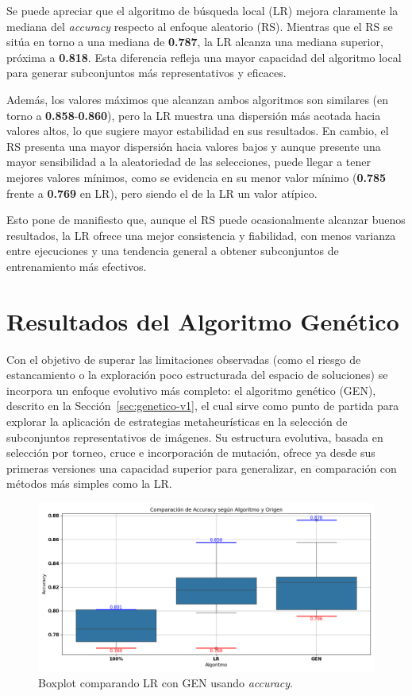 Se puede apreciar que el algoritmo de búsqueda local (LR) mejora claramente la mediana del \textit{accuracy} respecto al enfoque aleatorio (RS).
Mientras que el RS se sitúa en torno a una mediana de \textbf{0.787}, la LR alcanza una mediana superior, próxima a \textbf{0.818}.
Esta diferencia refleja una mayor capacidad del algoritmo local para generar subconjuntos más representativos y eficaces.

Además, los valores máximos que alcanzan ambos algoritmos son similares (en torno a \textbf{0.858}-\textbf{0.860}),
pero la LR muestra una dispersión más acotada hacia valores altos, lo que sugiere mayor estabilidad en sus resultados.
En cambio, el RS presenta una mayor dispersión hacia valores bajos y aunque presente una mayor sensibilidad a la aleatoriedad de las selecciones,
puede llegar a tener mejores valores mínimos, como se evidencia en su menor valor mínimo (\textbf{0.785} frente a \textbf{0.769} en LR),
pero siendo el de la LR un valor atípico.

Esto pone de manifiesto que, aunque el RS puede ocasionalmente alcanzar buenos resultados,
la LR ofrece una mejor consistencia y fiabilidad, con menos varianza entre ejecuciones y una tendencia general a obtener subconjuntos de entrenamiento más efectivos.


\section{Resultados del Algoritmo Genético}\label{sec:resultados-algoritmo-genetico}
Con el objetivo de superar las limitaciones observadas (como el riesgo de estancamiento o la exploración poco estructurada del espacio de soluciones)
se incorpora un enfoque evolutivo más completo: el algoritmo genético (GEN), descrito en la Sección~\ref{sec:genetico-v1}, el cual sirve como punto de partida para explorar la
aplicación de estrategias metaheurísticas en la selección de subconjuntos representativos de imágenes.
Su estructura evolutiva, basada en selección por torneo, cruce e incorporación de mutación,
ofrece ya desde sus primeras versiones una capacidad superior para generalizar, en comparación con métodos más simples como la LR.

\begin{figure}[htp]
    \centering
    \includegraphics[width=1\textwidth]{imagenes/evaluaciones/comparacion_lr-gen_v1}
    \caption{Boxplot comparando LR con GEN usando \textit{accuracy}.}
    \label{fig:lr-vs-gen-v1}
\end{figure}

